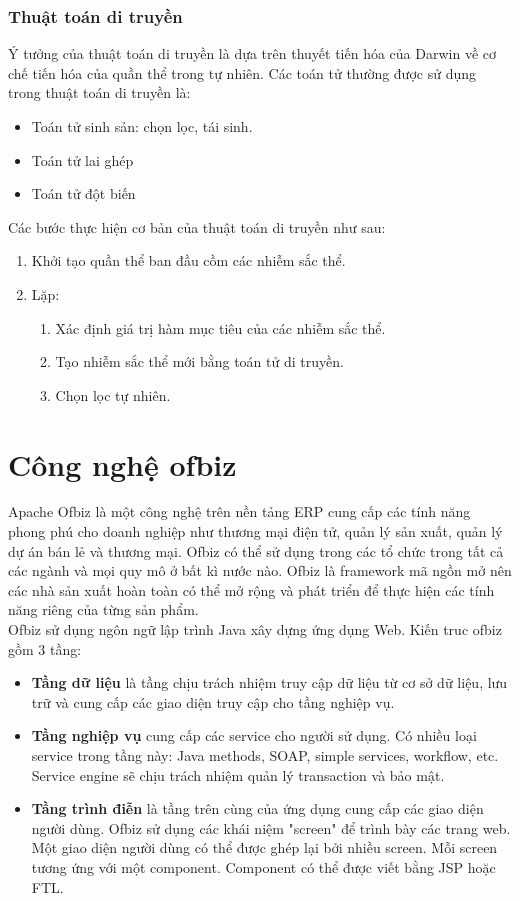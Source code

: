 \documentclass[a4paper,12pt]{report}
\begin{document}
\subsubsection{Thuật toán di truyền}
Ý tưởng của thuật toán di truyền là dựa trên thuyết tiến hóa của Darwin về cơ chế tiến hóa của quần thể trong tự nhiên. Các toán tử thường được sử dụng trong thuật toán di truyền là:
\begin{itemize}
\item Toán tử sinh sản: chọn lọc, tái sinh.
\item Toán tử lai ghép
\item Toán tử đột biến
\end{itemize} 
Các bước thực hiện cơ bản của thuật toán di truyền như sau:
\begin{enumerate}
\item Khởi tạo quần thể ban đầu cồm các nhiễm sắc thể.
\item Lặp:
\begin{enumerate}

\item Xác định giá trị hàm mục tiêu của các nhiễm sắc thể.
\item Tạo nhiễm sắc thể mới bằng toán tử di truyền.
\item Chọn lọc tự nhiên.\cite{GA}

\end{enumerate}
\end{enumerate}
\section{Công nghệ ofbiz}
\label{section:ofbiz}
Apache Ofbiz là một công nghệ trên nền tảng \ac{ERP} cung cấp các tính năng phong phú cho doanh nghiệp như thương mại điện tử, quản lý sản xuất,  quản lý dự án bán  lẻ và thương mại. Ofbiz có thể sử dụng trong các tổ chức trong tất cả các ngành và mọi quy mô ở bất kì nước nào. Ofbiz là framework mã ngồn mở nên các nhà sản xuất hoàn toàn có thể mở rộng và phát triển để thực hiện các tính năng riêng của từng sản phẩm. \\

Ofbiz sử dụng ngôn ngữ lập trình Java xây dựng ứng dụng Web. Kiến truc ofbiz gồm 3 tầng: 
\begin{itemize}
\item \textbf{Tầng dữ liệu}  là tầng chịu trách nhiệm truy cập dữ liệu từ cơ sở dữ liệu, lưu trữ và cung cấp các giao diện truy cập cho tầng nghiệp vụ.

\item \textbf{Tầng nghiệp vụ} cung cấp các service cho người sử dụng. Có nhiều loại service trong tầng này: Java methods, \ac{SOAP}, simple services, workflow, etc. Service engine sẽ chịu trách nhiệm quản lý transaction và bảo mật.
\item \textbf{Tầng trình điễn} là tầng trên cùng của ứng dụng cung cấp các giao diện người dùng. Ofbiz sử dụng các khái niệm "screen" để trình bày các trang web. Một giao diện người dùng có thể được ghép lại bởi nhiều screen. Mỗi screen tương ứng với một component. Component có thể được viết bằng \ac{JSP} hoặc \ac{FTL}. 
\end{itemize}
\end{document}

